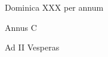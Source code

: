 \documentclass[a5paper, twoside, 12pt]{article}
\begin{document}
Dominica XXX per annum

Annus C

Ad II Vesperas
\end{document}
